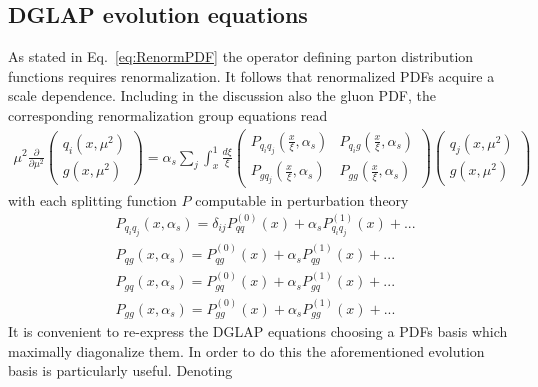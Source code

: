 \subsection{DGLAP evolution equations}
\label{sec:DGLAP}
As stated in Eq.~\eqref{eq:RenormPDF} the operator defining parton distribution functions requires
renormalization. It follows that renormalized PDFs acquire a scale dependence.
Including in the discussion also the gluon PDF, the corresponding renormalization group equations read
\begin{align}
    \mu^2\frac{\partial}{\partial\mu^2}
    \begin{pmatrix}
        q_i\left(x,\mu^2\right) \\  
        g\left(x,\mu^2\right)
    \end{pmatrix}
    =
    \alpha_s\sum_{j}\int_x^1 \frac{d\xi}{\xi} 
    \begin{pmatrix}
        P_{q_i q_j}\left(\frac{x}{\xi},\alpha_s\right) & P_{q_i g}\left(\frac{x}{\xi},\alpha_s\right) \\
        P_{g q_j}\left(\frac{x}{\xi},\alpha_s\right)   & P_{g g}\left(\frac{x}{\xi},\alpha_s\right) 
    \end{pmatrix}
    \begin{pmatrix}
        q_j\left(x,\mu^2\right) \\  
        g\left(x,\mu^2\right)
    \end{pmatrix}
\end{align}
with each splitting function $P$ computable in perturbation theory
\begin{equation}
    \begin{split}
    &P_{q_i q_j}\left(x,\alpha_s\right) = \delta_{ij}P^{(0)}_{qq}\left(x\right) 
    + \alpha_s P^{(1)}_{q_i q_j}\left(x\right) + ... \\
    &P_{q g}\left(x,\alpha_s\right) = P^{(0)}_{qg}\left(x\right) 
    + \alpha_s P^{(1)}_{q g}\left(x\right) + ... \\
    &P_{g q}\left(x,\alpha_s\right) = P^{(0)}_{gq}\left(x\right) 
    + \alpha_s P^{(1)}_{gq}\left(x\right) + ... \\
    &P_{g g}\left(x,\alpha_s\right) = P^{(0)}_{gg}\left(x\right) 
    + \alpha_s P^{(1)}_{gg}\left(x\right) + ... 
    \end{split}
\end{equation}
It is convenient to re-express the DGLAP equations choosing a PDFs basis which maximally diagonalize them. 
In order to do this the aforementioned evolution basis is particularly useful.
Denoting 
